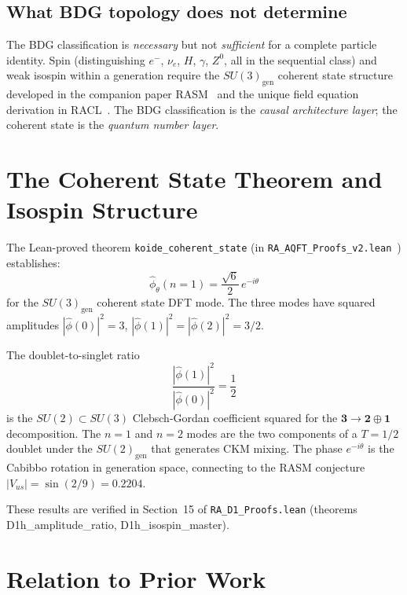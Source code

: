 \documentclass[11pt,a4paper]{article}
\begin{document}
\subsection{What BDG topology does not determine}

The BDG classification is \emph{necessary} but not \emph{sufficient}
for a complete particle identity. Spin (distinguishing $e^-$, $\nu_e$,
$H$, $\gamma$, $Z^0$, all in the sequential class) and weak isospin
within a generation require the $SU(3)_{\mathrm{gen}}$ coherent state
structure developed in the companion paper
RASM~\citep{Sandeman2026RASM} and the unique field equation derivation in RACL~\citep{Sandeman2026RACL}. The BDG classification is the
\emph{causal architecture layer}; the coherent state is the
\emph{quantum number layer}.

\section{The Coherent State Theorem and Isospin Structure}
\label{sec:D1h}

The Lean-proved theorem \texttt{koide\_coherent\_state}
(in \texttt{RA\_AQFT\_Proofs\_v2.lean}~\citep{Meiburg2025LQI}) establishes:
\[
  \hat{\phi}_\theta(n=1) = \frac{\sqrt{6}}{2}\,e^{-i\theta}
\]
for the $SU(3)_{\mathrm{gen}}$ coherent state DFT mode. The
three modes have squared amplitudes
$|\hat{\phi}(0)|^2 = 3$, $|\hat{\phi}(1)|^2 = |\hat{\phi}(2)|^2 = 3/2$.

The doublet-to-singlet ratio
\[
  \frac{|\hat{\phi}(1)|^2}{|\hat{\phi}(0)|^2} = \frac{1}{2}
\]
is the $SU(2) \subset SU(3)$ Clebsch-Gordan coefficient squared for
the $\mathbf{3} \to \mathbf{2} \oplus \mathbf{1}$ decomposition.
The $n=1$ and $n=2$ modes are the two components of a $T=1/2$ doublet
under the $SU(2)_{\mathrm{gen}}$ that generates CKM mixing. The
phase $e^{-i\theta}$ is the Cabibbo rotation in generation space,
connecting to the RASM conjecture $|V_{us}| = \sin(2/9) = 0.2204$.

These results are verified in Section~15 of \texttt{RA\_D1\_Proofs.lean}
(theorems D1h\_amplitude\_ratio, D1h\_isospin\_master).

\section{Relation to Prior Work}
\label{sec:related}
\end{document}
